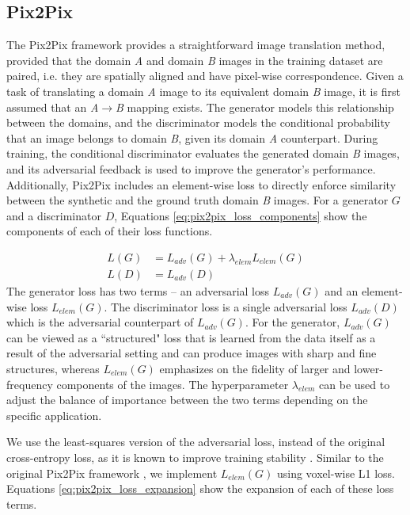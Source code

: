 \subsection{Pix2Pix}
\label{pix2pix}
The Pix2Pix framework provides a straightforward image translation method, provided that the domain \textit{A} and domain \textit{B} images in the training dataset are paired, i.e. they are spatially aligned and have pixel-wise correspondence. Given a task of translating a domain \textit{A} image to its equivalent domain \textit{B} image, it is first assumed that an \textit{A}$\rightarrow$\textit{B} mapping exists. The generator models this relationship between the domains, and the discriminator models the conditional probability that an image belongs to domain \textit{B}, given its domain \textit{A} counterpart. During training, the conditional discriminator evaluates the generated domain \textit{B} images, and its adversarial feedback is used to improve the generator's performance. Additionally, Pix2Pix includes an element-wise loss to directly enforce similarity between the synthetic and the ground truth domain \textit{B} images. For a generator $G$ and a discriminator $D$, Equations \ref{eq:pix2pix_loss_components} show the components of each of their loss functions. 

\begin{equation}
    \begin{aligned}
    L(G) &= L_{adv}(G) + \lambda_{elem} L_{elem}(G) \\
    L(D) &= L_{adv}(D)
    \end{aligned}
    \label{eq:pix2pix_loss_components}
\end{equation}
The generator loss has two terms -- an adversarial loss $L_{adv}(G)$ and an element-wise loss $L_{elem}(G)$. The discriminator loss is a single adversarial loss $L_{adv}(D)$ which is the adversarial counterpart of $L_{adv}(G)$. For the generator, $L_{adv}(G)$ can be viewed as a ``structured" loss that is learned from the data itself as a result of the adversarial setting and can produce images with sharp and fine structures, whereas $L_{elem}(G)$ emphasizes on the fidelity of larger and lower-frequency components of the images. The hyperparameter $\lambda_{elem}$ can be used to adjust the balance of importance between the two terms depending on the specific application.

We use the least-squares version of the adversarial loss, instead of the original cross-entropy loss, as it is known to improve training stability \cite{mao2017least}. Similar to the original Pix2Pix framework \cite{isola2017image}, we implement $L_{elem}(G)$ using voxel-wise L1 loss. Equations \ref{eq:pix2pix_loss_expansion} show the expansion of each of these loss terms.

